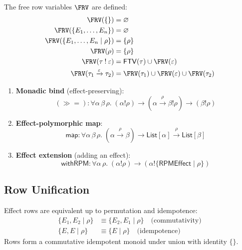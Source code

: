 \begin{definition}
\label{def:free-row-vars}
The free row variables $\FRV$ are defined:
\begin{align}
\FRV(\{\}) &= \varnothing \\
\FRV(\{E_1, \ldots, E_n\}) &= \varnothing \\
\FRV(\{E_1, \ldots, E_n \mid \rho\}) &= \{\rho\} \\
\FRV(\rho) &= \{\rho\} \\
\FRV(\tau \mathbin{!} \varepsilon) &= \FTV(\tau) \cup \FRV(\varepsilon) \\
\FRV(\tau_1 \xrightarrow{\varepsilon} \tau_2) &= \FRV(\tau_1) \cup \FRV(\varepsilon) \cup \FRV(\tau_2)
\end{align}
\end{definition}

\begin{example}
\label{ex:effect-poly}
\begin{enumerate}
  \item \textbf{Monadic bind} (effect-preserving):
  \[
  (\gg\!=) : \forall \alpha\, \beta\, \rho.\; (\alpha \mathbin{!} \rho) \to (\alpha \xrightarrow{\rho} \beta \mathbin{!} \rho) \to (\beta \mathbin{!} \rho)
  \]

  \item \textbf{Effect-polymorphic map}:
  \[
  \mathsf{map} : \forall \alpha\, \beta\, \rho.\; (\alpha \xrightarrow{\rho} \beta) \to \mathsf{List}[\alpha] \xrightarrow{\rho} \mathsf{List}[\beta]
  \]

  \item \textbf{Effect extension} (adding an effect):
  \[
  \mathsf{withRPM} : \forall \alpha\, \rho.\; (\alpha \mathbin{!} \rho) \to (\alpha \mathbin{!} \{\mathsf{RPMEffect} \mid \rho\})
  \]
\end{enumerate}
\end{example}

\subsection{Row Unification}
\label{subsec:row-unification}

\begin{definition}
\label{def:row-equiv}
Effect rows are equivalent up to permutation and idempotence:
\begin{align}
\{E_1, E_2 \mid \rho\} &\equiv \{E_2, E_1 \mid \rho\} \quad \text{(commutativity)} \\
\{E, E \mid \rho\} &\equiv \{E \mid \rho\} \quad \text{(idempotence)}
\end{align}
Rows form a commutative idempotent monoid under union with identity $\{\}$.
\end{definition}

